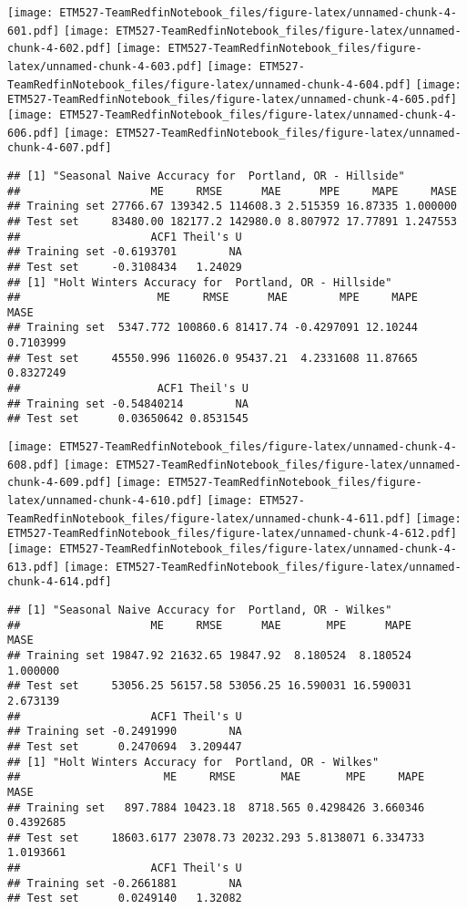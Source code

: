 \documentclass[]{article}
\begin{document}
\texttt{[image: ETM527-TeamRedfinNotebook\_files/figure-latex/unnamed-chunk-4-601.pdf]}
\texttt{[image: ETM527-TeamRedfinNotebook\_files/figure-latex/unnamed-chunk-4-602.pdf]}
\texttt{[image: ETM527-TeamRedfinNotebook\_files/figure-latex/unnamed-chunk-4-603.pdf]}
\texttt{[image: ETM527-TeamRedfinNotebook\_files/figure-latex/unnamed-chunk-4-604.pdf]}
\texttt{[image: ETM527-TeamRedfinNotebook\_files/figure-latex/unnamed-chunk-4-605.pdf]}
\texttt{[image: ETM527-TeamRedfinNotebook\_files/figure-latex/unnamed-chunk-4-606.pdf]}
\texttt{[image: ETM527-TeamRedfinNotebook\_files/figure-latex/unnamed-chunk-4-607.pdf]}

\begin{verbatim}
## [1] "Seasonal Naive Accuracy for  Portland, OR - Hillside"
##                    ME     RMSE      MAE      MPE     MAPE     MASE
## Training set 27766.67 139342.5 114608.3 2.515359 16.87335 1.000000
## Test set     83480.00 182177.2 142980.0 8.807972 17.77891 1.247553
##                    ACF1 Theil's U
## Training set -0.6193701        NA
## Test set     -0.3108434   1.24029
## [1] "Holt Winters Accuracy for  Portland, OR - Hillside"
##                     ME     RMSE      MAE        MPE     MAPE      MASE
## Training set  5347.772 100860.6 81417.74 -0.4297091 12.10244 0.7103999
## Test set     45550.996 116026.0 95437.21  4.2331608 11.87665 0.8327249
##                     ACF1 Theil's U
## Training set -0.54840214        NA
## Test set      0.03650642 0.8531545
\end{verbatim}

\texttt{[image: ETM527-TeamRedfinNotebook\_files/figure-latex/unnamed-chunk-4-608.pdf]}
\texttt{[image: ETM527-TeamRedfinNotebook\_files/figure-latex/unnamed-chunk-4-609.pdf]}
\texttt{[image: ETM527-TeamRedfinNotebook\_files/figure-latex/unnamed-chunk-4-610.pdf]}
\texttt{[image: ETM527-TeamRedfinNotebook\_files/figure-latex/unnamed-chunk-4-611.pdf]}
\texttt{[image: ETM527-TeamRedfinNotebook\_files/figure-latex/unnamed-chunk-4-612.pdf]}
\texttt{[image: ETM527-TeamRedfinNotebook\_files/figure-latex/unnamed-chunk-4-613.pdf]}
\texttt{[image: ETM527-TeamRedfinNotebook\_files/figure-latex/unnamed-chunk-4-614.pdf]}

\begin{verbatim}
## [1] "Seasonal Naive Accuracy for  Portland, OR - Wilkes"
##                    ME     RMSE      MAE       MPE      MAPE     MASE
## Training set 19847.92 21632.65 19847.92  8.180524  8.180524 1.000000
## Test set     53056.25 56157.58 53056.25 16.590031 16.590031 2.673139
##                    ACF1 Theil's U
## Training set -0.2491990        NA
## Test set      0.2470694  3.209447
## [1] "Holt Winters Accuracy for  Portland, OR - Wilkes"
##                      ME     RMSE       MAE       MPE     MAPE      MASE
## Training set   897.7884 10423.18  8718.565 0.4298426 3.660346 0.4392685
## Test set     18603.6177 23078.73 20232.293 5.8138071 6.334733 1.0193661
##                    ACF1 Theil's U
## Training set -0.2661881        NA
## Test set      0.0249140   1.32082
\end{verbatim}
\end{document}
